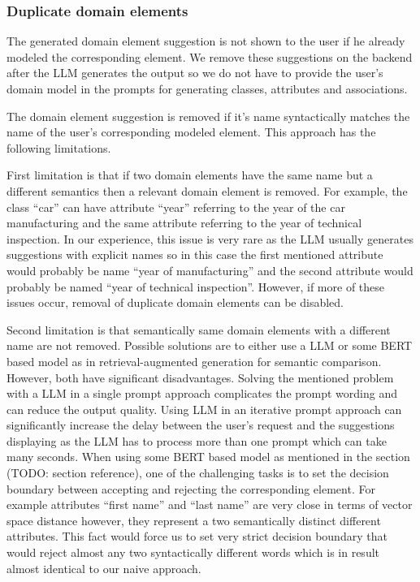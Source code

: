 \subsubsection{Duplicate domain elements}
\label{duplicate_domain_elements}
The generated domain element suggestion is not shown to the user if he already modeled the corresponding element. We remove these suggestions on the backend after the LLM generates the output so we do not have to provide the user's domain model in the prompts for generating classes, attributes and associations.

The domain element suggestion is removed if it's name syntactically matches the name of the user's corresponding modeled element. This approach has the following limitations.

First limitation is that if two domain elements have the same name but a different semantics then a relevant domain element is removed. For example, the class ``car'' can have attribute ``year'' referring to the year of the car manufacturing and the same attribute referring to the year of technical inspection. In our experience, this issue is very rare as the LLM usually generates suggestions with explicit names so in this case the first mentioned attribute would probably be name ``year of manufacturing'' and the second attribute would probably be named ``year of technical inspection''. However, if more of these issues occur, removal of duplicate domain elements can be disabled.

Second limitation is that semantically same domain elements with a different name are not removed. Possible solutions are to either use a LLM or some BERT based model as in retrieval-augmented generation for semantic comparison. However, both have significant disadvantages. Solving the mentioned problem with a LLM in a single prompt approach complicates the prompt wording and can reduce the output quality. Using LLM in an iterative prompt approach can significantly increase the delay between the user's request and the suggestions displaying as the LLM has to process more than one prompt which can take many seconds. When using some BERT based model as mentioned in the section (TODO: section reference), one of the challenging tasks is to set the decision boundary between accepting and rejecting the corresponding element. For example attributes ``first name'' and ``last name'' are very close in terms of vector space distance however, they represent a two semantically distinct different attributes. This fact would force us to set very strict decision boundary that would reject almost any two syntactically different words which is in result almost identical to our naive approach.



